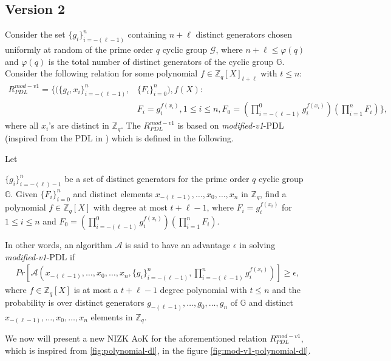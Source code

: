 \subsection{Version 2}
\label{subsec:v1}
Consider the set $\{g_i\}_{i=-(\ell-1)}^n$ containing $n+\ell$ distinct generators chosen uniformly at random of 
the prime order $q$ cyclic group $\mathcal{G}$, where $n+\ell\leq\varphi(q)$ and $\varphi(q)$ is 
the total number of distinct generators of the cyclic group $\mathbb{G}$. Consider the following relation for 
some polynomial $f\in\mathbb{Z}_q[X]_{t+\ell}$ with $t\leq n$:
\begin{align}\label{eq:relation_mod_v1_PDL}
  R_{PDL}^{mod-v1} = \{(\{g_i,x_i\}_{i=-(\ell-1)}^n,&\{F_i\}_{i=0}^n),f(X) :\nonumber\\
   &F_i=g_i^{f(x_i)}, 1\leq i\leq n, F_0=(\prod_{i=-(\ell-1)}^{0}g_i^{f(x_i)})(\prod_{i=1}^{n}F_i)\},
\end{align}
where all $x_i$'s are distinct in $\mathbb{Z}_q$. The $R_{PDL}^{mod-v1}$ is based on \textit{modified-v1}-PDL (inspired from the PDL in \cite{cryptoeprint:2023/1669}) 
which is defined in the following.

\begin{definition}
  Let\par 
  $\{g_i\}_{i=-(\ell)-1}^n$ be a set of distinct generators for the prime order $q$ cyclic 
  group $\mathbb{G}$. Given $\{F_i\}_{i=0}^n$ and distinct elements $x_{-(\ell-1)},\dots,x_0,\dots,x_n$ in 
  $\mathbb{Z}_q$, find a polynomial $f\in\mathbb{Z}_q[X]$ with degree at most $t+\ell-1$, where 
  $F_i=g_i^{f(x_i)}$ for $1\leq i\leq n$ and $F_0=(\prod_{i=-(\ell-1)}^{0}g_i^{f(x_i)})(\prod_{i=1}^{n}F_i)$.\par

  In other words, an algorithm $\mathcal{A}$ is said to have an advantage $\epsilon$ in solving \textit{modified-v1}-PDL if 
  \begin{align*}
    Pr[\mathcal{A}(x_{-(\ell-1)},\dots,x_0,\dots,x_n,\{g_i\}_{i=-(\ell-1)}^n,\prod_{i=-(\ell-1)}^{n}g_i^{f(x_i)})]\geq\epsilon,
  \end{align*}
  where $f\in\mathbb{Z}_q[X]$ is at most a $t+\ell-1$ degree polynomial with $t\leq n$ and the probability is over 
  distinct generators $g_{-(\ell-1)},\dots,g_0,\dots,g_n$ of $\mathbb{G}$ and distinct $x_{-(\ell-1)},\dots,x_0,\dots,x_n$ 
  elements in $\mathbb{Z}_q$.
\end{definition}

We now will present a new NIZK AoK for the aforementioned relation $R_{PDL}^{mod-v1}$, which is inspired from \ref{fig:polynomial-dl}, 
in the figure \ref{fig:mod-v1-polynomial-dl}.

